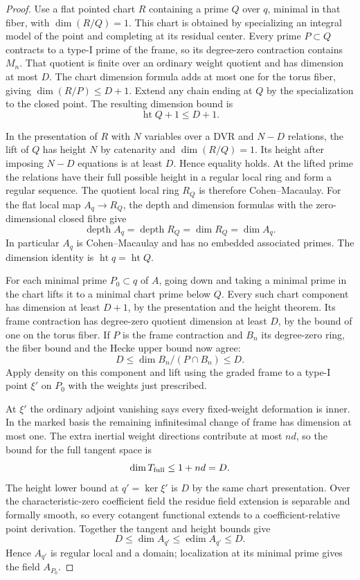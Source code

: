 \begin{proof}
Use a flat pointed chart \(R\) containing a prime \(Q\) over
\(q\), minimal in that fiber, with \(\dim(R/Q)=1\). This chart
is obtained by specializing an integral model of the point
and completing at its residual center. Every prime \(P\subset Q\)
contracts to a type-I prime of the frame, so its degree-zero
contraction contains \(M_n\). That quotient is finite over an
ordinary weight quotient and has dimension at most \(D\).
The chart dimension formula adds at most one for the torus
fiber, giving \(\dim(R/P)\le D+1\). Extend any chain ending at \(Q\) by the specialization to the closed point. The resulting dimension bound is
\[
 \operatorname{ht}Q+1\le D+1 .
\]

In the presentation of \(R\) with \(N\) variables over a
DVR and \(N-D\) relations, the lift of \(Q\) has height \(N\)
by catenarity and \(\dim(R/Q)=1\). Its height after imposing
\(N-D\) equations is at least \(D\). Hence equality holds.
At the lifted prime the relations have their full possible
height in a regular local ring and form a regular sequence.
The quotient local ring \(R_Q\) is therefore Cohen--Macaulay.
For the flat local map \(A_q\to R_Q\), the depth and dimension
formulas with the zero-dimensional closed fibre give
\[
 \operatorname{depth}A_q=\operatorname{depth}R_Q
      =\dim R_Q=\dim A_q .
\]
In particular \(A_q\) is Cohen--Macaulay and has no embedded
associated primes. The dimension identity is
\(\operatorname{ht}q=\operatorname{ht}Q\).

For each minimal prime \(P_0\subset q\) of \(A\), going down
and taking a minimal prime in the chart lifts it to a minimal
chart prime below \(Q\). Every such chart component has
dimension at least \(D+1\), by the presentation and the
height theorem. Its frame contraction has degree-zero quotient
dimension at least \(D\), by the bound of one on the torus
fiber. If \(P\) is the frame contraction and \(B_n\) its degree-zero ring, the fiber bound and the Hecke upper bound now agree: 
\[
 D\le\dim B_n/(P\cap B_n)\le D.
\]
 Apply density on this component and lift using the
graded frame to a type-I point \(\xi'\) on \(P_0\) with
the weights just prescribed.

At \(\xi'\) the ordinary adjoint
vanishing says every fixed-weight deformation is inner.
In the marked basis the remaining infinitesimal change of
frame has dimension at most one. The extra inertial weight directions contribute at most \(nd\), so the bound for the full tangent space is
\[
 \dim T_{\rm full}\le 1+nd=D .
\] The height lower
bound at \(q'=\ker\xi'\) is \(D\) by the same chart
presentation. Over the characteristic-zero coefficient field
the residue field extension is separable and formally smooth,
so every cotangent functional extends to a coefficient-relative
point derivation. Together the tangent and height bounds give 
\[
 D\le\dim A_{q'}\le\operatorname{edim} A_{q'}\le D.
\]
 Hence \(A_{q'}\) is regular local and a domain; localization at its minimal prime gives the field \(A_{P_0}\).


\end{proof}
